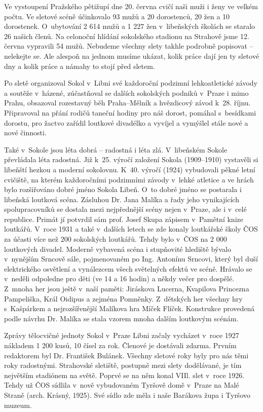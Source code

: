 \documentclass[a5paper, 11pt, twoside]{article}
\begin{document}
Ve vystoupení Pražského pětižupí dne 20. června cvičí naši muži i ženy
ve velkém počtu. Ve sletové scéně účinkovalo 93 mužů a 20 dorostenců, 20
žen a 10 dorostenek. O~ubytování 2 614 mužů a 1 227 žen v~libeňských
školách se staralo 26 našich členů. Na celonoční hlídání sokolského
stadionu na Strahově jsme 12. června vypravili 54 mužů. Nebudeme všechny
slety takhle podrobně popisovat -- nelekejte se. Ale alespoň na jednom
musíme ukázat, kolik práce dají jen ty sletové dny a kolik práce a
námahy to stojí před sletem.

Po sletě organizoval Sokol v~Libni své každoroční podzimní
lehkoatletické závody a soutěže v~házené, zúčastňoval se dalších
sokolských podniků v~Praze i mimo Prahu, obsazoval rozestavný běh
Praha--Mělník a hvězdicový závod k~28. říjnu. Připravoval na přání
rodičů taneční hodiny pro náš dorost, pomáhal s~besídkami dorostu, pro
žactvo zařídil loutkové divadélko a vyvíjel a vymýšlel stále nové a nové
činnosti.

Také v~Sokole jsou léta dobrá --⁠⁠⁠⁠⁠⁠ radostná i léta zlá. V~libeňském Sokole
převládala léta radostná. Již k~25. výročí založení Sokola
(1909--1910) vystavěli si libeňští hezkou a moderní
sokolovnu. K~40. výročí (1924) vybudovali pěkné letní cvičiště, na
kterém každoročními podzimními závody v~lehké atletice a ve hrách bylo
rozšiřováno dobré jméno Sokola Libeň. O~to dobré jméno se postarala i
libeňská loutková scéna. Zásluhou Dr. Jana Malíka a řady jeho %
vynikajících spolupracovníků se dostala mezi nejpřednější scény nejen
v~Praze, ale i v~celé republice. Primát jí potvrdil sám prof. Josef Skupa
zápisem v~Pamětní knize loutkářů. V~roce 1931 a také v~dalších letech se
zde konaly loutkářské školy ČOS za účasti více než 200 sokolských
loutkářů. Tehdy bylo v~ČOS na 2 000 loutkových divadel. Moderně vybavená
scéna i stupňovité hlediště bývalo v~nynějším Srncově sále, pojmenovaném
po Ing. Antonínu Srncovi, který byl duší elektrického osvětlení a
vynálezcem všech světelných efektů ve scéně. Hrávalo se v~neděli
odpoledne pro děti (ve 14 a 16 hodin) a někdy večer pro dospělé. Z~mnoha
her jsou ještě v~naší paměti: Jiráskova Lucerna, Kvapilova Princezna
Pampeliška, Král Oidipus a zejména Pomněnky. Z~dětských her všechny hry
s~Kašpárkem a nejrozšířenější Malíkova hra Míček Flíček. Konstrukce
provedená podle návrhu Dr. Malíka se stala vzorem mnoha dalším loutkovým
scénám.

Zprávy tělocvičné jednoty Sokol v~Praze Libni začaly vycházet v~roce
1927 nákladem 1 200 kusů, 10 čísel za rok. Členové je dostávali zdarma.
Prvním redaktorem byl Dr. František Bulánek. Všechny sletové roky byly
pro nás těmi roky radostnými. Strahovské sletiště, postupně mezi slety
dodělávané, je tím největším stadiónem na světě. Poprvé se na něm konal
VIIl. slet v~roce 1926. Tehdy už ČOS sídlila v~nově vybudovaném Tyršově
domě v~Praze na Malé Straně (arch. Krásný, 1925). Své sídlo zde měla i
naše Barákova župa i Tyršovo muzeum.
\end{document}
